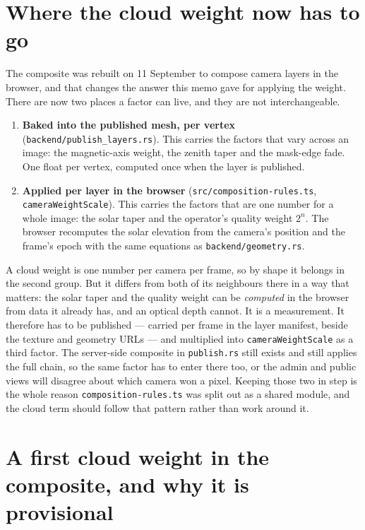 \documentclass[11pt,a4paper]{article}
\begin{document}
\section{Where the cloud weight now has to go}
\label{sec:weightpath}

The composite was rebuilt on 11 September to compose camera layers in the
browser, and that changes the answer this memo gave for applying the weight.
There are now two places a factor can live, and they are not
interchangeable.

\begin{enumerate}
  \item \textbf{Baked into the published mesh, per vertex}
    (\texttt{backend/publish\_layers.rs}). This carries the factors that vary
    across an image: the magnetic-axis weight, the zenith taper and the
    mask-edge fade. One float per vertex, computed once when the layer is
    published.
  \item \textbf{Applied per layer in the browser}
    (\texttt{src/composition-rules.ts}, \texttt{cameraWeightScale}). This
    carries the factors that are one number for a whole image: the solar taper
    and the operator's quality weight $2^{n}$. The browser recomputes the solar
    elevation from the camera's position and the frame's epoch with the same
    equations as \texttt{backend/geometry.rs}.
\end{enumerate}

A cloud weight is one number per camera per frame, so by shape it belongs in
the second group. But it differs from both of its neighbours there in a way
that matters: the solar taper and the quality weight can be \emph{computed} in
the browser from data it already has, and an optical depth cannot. It is a
measurement. It therefore has to be published --- carried per frame in the
layer manifest, beside the texture and geometry URLs --- and multiplied into
\texttt{cameraWeightScale} as a third factor. The server-side composite in
\texttt{publish.rs} still exists and still applies the full chain, so the same
factor has to enter there too, or the admin and public views will disagree
about which camera won a pixel. Keeping those two in step is the whole reason
\texttt{composition-rules.ts} was split out as a shared module, and the cloud
term should follow that pattern rather than work around it.

\section{A first cloud weight in the composite, and why it is provisional}
\label{sec:cloudweight}
\end{document}
